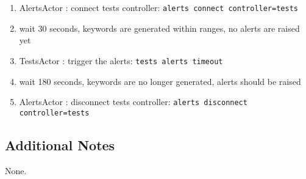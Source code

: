 \begin{enumerate}
    \item AlertsActor : connect tests controller: \texttt{alerts connect controller=tests}
    \item wait 30 seconds, keywords are generated within ranges, no alerts are raised yet
    \item TestsActor : trigger the alerts: \texttt{tests alerts timeout}
    \item wait 180 seconds, keywords are no longer generated, alerts should be raised
    \item AlertsActor : disconnect tests controller: \texttt{alerts disconnect controller=tests}
\end{enumerate}

\subsection{Additional Notes}
None.
